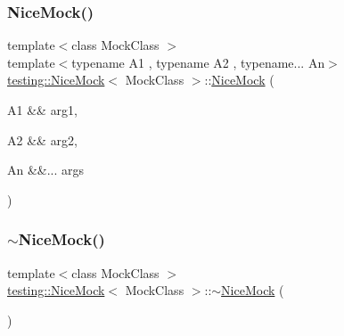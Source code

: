 \subsubsection{\texorpdfstring{NiceMock()}{NiceMock()}\hspace{0.1cm}{\footnotesize\ttfamily [6/17]}}
{\footnotesize\ttfamily template$<$class Mock\+Class $>$ \\
template$<$typename A1 , typename A2 , typename... An$>$ \\
\mbox{\hyperlink{classtesting_1_1_nice_mock}{testing\+::\+Nice\+Mock}}$<$ Mock\+Class $>$\+::\mbox{\hyperlink{classtesting_1_1_nice_mock}{Nice\+Mock}} (\begin{DoxyParamCaption}\item[{A1 \&\&}]{arg1,  }\item[{A2 \&\&}]{arg2,  }\item[{An \&\&...}]{args }\end{DoxyParamCaption})\hspace{0.3cm}{\ttfamily [inline]}}

\mbox{\label{classtesting_1_1_nice_mock_a30be5e5e20248f31c8390cd88fa74d7f}} 
\subsubsection{\texorpdfstring{$\sim$NiceMock()}{~NiceMock()}\hspace{0.1cm}{\footnotesize\ttfamily [2/3]}}
{\footnotesize\ttfamily template$<$class Mock\+Class $>$ \\
\mbox{\hyperlink{classtesting_1_1_nice_mock}{testing\+::\+Nice\+Mock}}$<$ Mock\+Class $>$\+::$\sim$\mbox{\hyperlink{classtesting_1_1_nice_mock}{Nice\+Mock}} (\begin{DoxyParamCaption}{ }\end{DoxyParamCaption})\hspace{0.3cm}{\ttfamily [inline]}}

\mbox{\label{classtesting_1_1_nice_mock_a10bbd6ebe779ac8ab1f9f3ae2dee9310}} 
